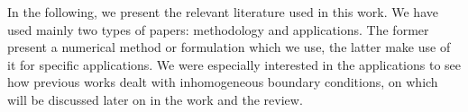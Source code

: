 



In the following, we present the relevant literature used in this work.
We have used mainly two types of papers: 
methodology and applications.
The former present a numerical method or formulation 
which we use, 
the latter make use of it for specific applications.
We were especially interested in the applications to see how
previous works dealt with inhomogeneous boundary conditions,
on which will be discussed later on in the work and the review.

